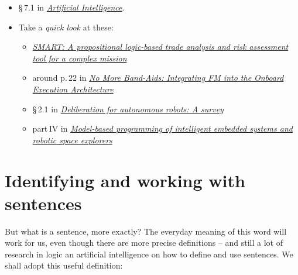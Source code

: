 \documentclass[
  a4paper,
  DIV=11,
  numbers=noendperiod,
  oneside]{scrreprt}
\providecommand{\tightlist}{%
  \setlength{\itemsep}{0pt}\setlength{\parskip}{0pt}}\usepackage{longtable,booktabs,array}
\begin{document}
\begin{tcolorbox}[enhanced jigsaw, colback=white, titlerule=0mm, toptitle=1mm, breakable, colbacktitle=quarto-callout-caution-color!10!white, opacitybacktitle=0.6, colframe=quarto-callout-caution-color-frame, opacityback=0, arc=.35mm, leftrule=.75mm, title={\faIcon{book} Reading}, left=2mm, bottomtitle=1mm, rightrule=.15mm, bottomrule=.15mm, toprule=.15mm, coltitle=black]

\begin{itemize}
\tightlist
\item
  §\,7.1 in
  \href{https://hvl.instructure.com/courses/25074/modules/items/660089}{\emph{Artificial
  Intelligence}}.
\item
  Take a \emph{quick look} at these:

  \begin{itemize}
  \tightlist
  \item
    \href{https://hdl.handle.net/2014/45618}{\emph{SMART: A
    propositional logic-based trade analysis and risk assessment tool
    for a complex mission}}
  \item
    around p.\,22 in
    \href{https://www.nasa.gov/sites/default/files/637606main_day_1-michel_ingham.pdf}{\emph{No
    More Band-Aids: Integrating FM into the Onboard Execution
    Architecture}}
  \item
    §\,2.1 in
    \href{http://doi.org/10.1016/j.artint.2014.11.003}{\emph{Deliberation
    for autonomous robots: A survey}}
  \item
    part\,IV in
    \href{https://hvl.instructure.com/courses/25074/modules/items/668587}{\emph{Model-based
    programming of intelligent embedded systems and robotic space
    explorers}}
  \end{itemize}
\end{itemize}

\end{tcolorbox}

\hypertarget{identifying-and-working-with-sentences}{%
\section{Identifying and working with
sentences}\label{identifying-and-working-with-sentences}}

But what is a sentence, more exactly? The everyday meaning of this word
will work for us, even though there are more precise definitions -- and
still a lot of research in logic an artificial intelligence on how to
define and use sentences. We shall adopt this useful definition:
\end{document}
